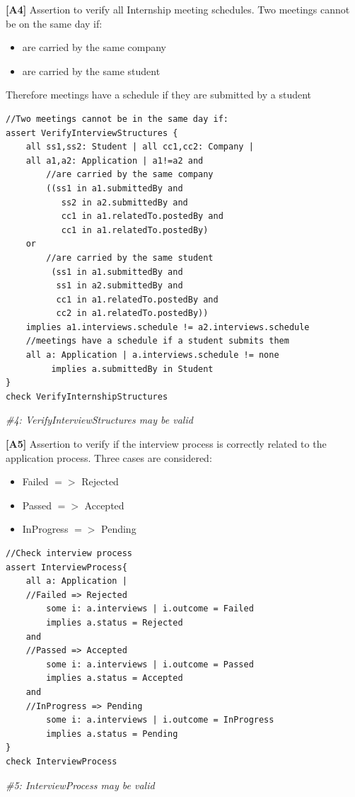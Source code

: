 \textbf{[A4]} Assertion to verify all Internship meeting schedules. Two meetings cannot be on the same day if:
\begin{itemize}
    \item are carried by the same company
    \item are carried by the same student
\end{itemize}
Therefore meetings have a schedule if they are submitted by a student
\begin{lstlisting}
//Two meetings cannot be in the same day if:
assert VerifyInterviewStructures {
	all ss1,ss2: Student | all cc1,cc2: Company |
   	all a1,a2: Application | a1!=a2 and
		//are carried by the same company
   		((ss1 in a1.submittedBy and 
		   ss2 in a2.submittedBy and
   		   cc1 in a1.relatedTo.postedBy and
		   cc1 in a1.relatedTo.postedBy)
   	or
		//are carried by the same student
   		 (ss1 in a1.submittedBy and 
		  ss1 in a2.submittedBy and
   		  cc1 in a1.relatedTo.postedBy and 
		  cc2 in a1.relatedTo.postedBy))
   	implies a1.interviews.schedule != a2.interviews.schedule
  	//meetings have a schedule if a student submits them
   	all a: Application | a.interviews.schedule != none 
   		 implies a.submittedBy in Student
}
check VerifyInternshipStructures
\end{lstlisting}
\textit{\#4: VerifyInterviewStructures may be valid}

\textbf{[A5]} Assertion to verify if the interview process is correctly related to the application process. Three cases are considered:
\begin{itemize}
    \item Failed $=>$ Rejected
    \item Passed $=>$ Accepted
    \item InProgress $=>$ Pending
\end{itemize}
\begin{lstlisting}
//Check interview process
assert InterviewProcess{
    all a: Application | 
	//Failed => Rejected
        some i: a.interviews | i.outcome = Failed 
		implies a.status = Rejected
	and 
	//Passed => Accepted
        some i: a.interviews | i.outcome = Passed 
		implies a.status = Accepted
	and
	//InProgress => Pending
        some i: a.interviews | i.outcome = InProgress 
		implies a.status = Pending
}
check InterviewProcess
\end{lstlisting}
\textit{\#5: InterviewProcess may be valid}